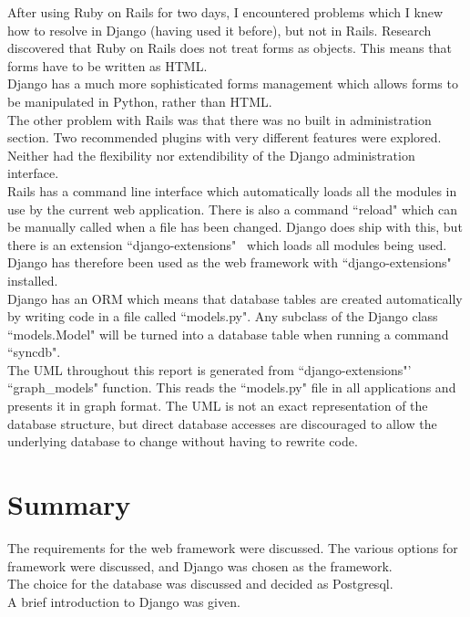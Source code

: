 After using Ruby on Rails for two days, I encountered problems which I knew how to resolve in Django (having used it before), but not in Rails. Research discovered that Ruby on Rails does not treat forms as objects. This means that forms have to be written as HTML. \\

Django has a much more sophisticated forms management which allows forms to be manipulated in Python, rather than HTML. \\

The other problem with Rails was that there was no built in administration section. Two recommended plugins with very different features were explored. Neither had the flexibility nor extendibility of the Django administration interface. \\

Rails has a command line interface which automatically loads all the modules in use by the current web application. There is also a command ``reload" which can be manually called when a file has been changed. Django does ship with this, but there is an extension ``django-extensions"~\cite{extensions} which loads all modules being used. \\

Django has therefore been used as the web framework with ``django-extensions" installed. \\

Django has an \gls{ORM} which means that database tables are created automatically by writing code in a file called ``models.py". Any subclass of the Django class ``models.Model" will be turned into a database table when running a command ``syncdb". \\

The UML throughout this report is generated from ``django-extensions"' ``graph\_models" function. This reads the ``models.py" file in all applications and presents it in graph format. The UML is not an exact representation of the database structure, but direct database accesses are discouraged to allow the underlying database to change without having to rewrite code.

\section{Summary}
The requirements for the web framework were discussed. The various options for framework were discussed, and Django was chosen as the framework. \\
The choice for the database was discussed and decided as Postgresql. \\
A brief introduction to Django was given.